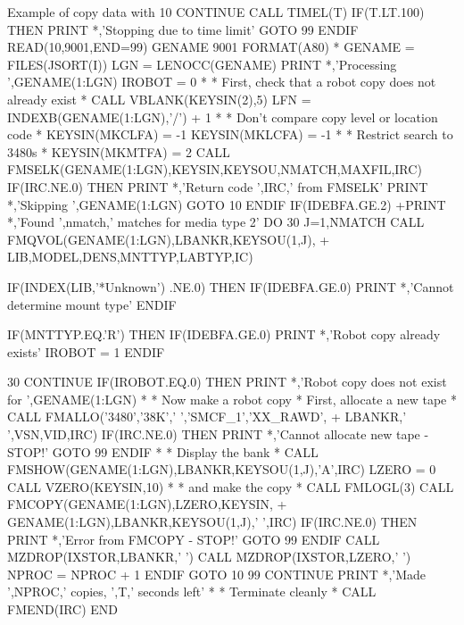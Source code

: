 \begin{XMPt}{Example of copy data with \protect{}}
10    CONTINUE
      CALL TIMEL(T)
      IF(T.LT.100) THEN
         PRINT *,'Stopping due to time limit'
         GOTO 99
      ENDIF
      READ(10,9001,END=99) GENAME
9001  FORMAT(A80)
*     GENAME = FILES(JSORT(I))
      LGN = LENOCC(GENAME)
      PRINT *,'Processing ',GENAME(1:LGN)
      IROBOT = 0
*
*     First, check that a robot copy does not already exist
*
      CALL VBLANK(KEYSIN(2),5)
      LFN = INDEXB(GENAME(1:LGN),'/') + 1
*
*     Don't compare copy level or location code
*
      KEYSIN(MKCLFA) = -1
      KEYSIN(MKLCFA) = -1
*
*     Restrict search to 3480s
*
      KEYSIN(MKMTFA) = 2
      CALL FMSELK(GENAME(1:LGN),KEYSIN,KEYSOU,NMATCH,MAXFIL,IRC)
      IF(IRC.NE.0) THEN
         PRINT *,'Return code ',IRC,' from FMSELK'
         PRINT *,'Skipping ',GENAME(1:LGN)
         GOTO 10
      ENDIF
      IF(IDEBFA.GE.2)
     +PRINT *,'Found ',nmatch,' matches for media type 2'
      DO 30 J=1,NMATCH
      CALL FMQVOL(GENAME(1:LGN),LBANKR,KEYSOU(1,J),
     +            LIB,MODEL,DENS,MNTTYP,LABTYP,IC)
 
      IF(INDEX(LIB,'*Unknown') .NE.0) THEN
         IF(IDEBFA.GE.0) PRINT *,'Cannot determine mount type'
      ENDIF
 
      IF(MNTTYP.EQ.'R') THEN
         IF(IDEBFA.GE.0) PRINT *,'Robot copy already exists'
         IROBOT = 1
      ENDIF
 
30    CONTINUE
      IF(IROBOT.EQ.0) THEN
         PRINT *,'Robot copy does not exist for ',GENAME(1:LGN)
*
*     Now make a robot copy
*     First, allocate a new tape
*
         CALL FMALLO('3480','38K',' ','SMCF_1','XX_RAWD',
     +               LBANKR,' ',VSN,VID,IRC)
         IF(IRC.NE.0) THEN
            PRINT *,'Cannot allocate new tape - STOP!'
            GOTO 99
         ENDIF
*
*     Display the bank
*
         CALL FMSHOW(GENAME(1:LGN),LBANKR,KEYSOU(1,J),'A',IRC)
         LZERO = 0
         CALL VZERO(KEYSIN,10)
*
*     and make the copy
*
         CALL FMLOGL(3)
         CALL FMCOPY(GENAME(1:LGN),LZERO,KEYSIN,
     +               GENAME(1:LGN),LBANKR,KEYSOU(1,J),' ',IRC)
         IF(IRC.NE.0) THEN
            PRINT *,'Error from FMCOPY - STOP!'
            GOTO 99
         ENDIF
         CALL MZDROP(IXSTOR,LBANKR,' ')
         CALL MZDROP(IXSTOR,LZERO,' ')
         NPROC = NPROC + 1
      ENDIF
      GOTO 10
99    CONTINUE
      PRINT *,'Made ',NPROC,' copies, ',T,' seconds left'
*
*     Terminate cleanly
*
      CALL FMEND(IRC)
      END
\end{XMPt}
\newpage
{}
